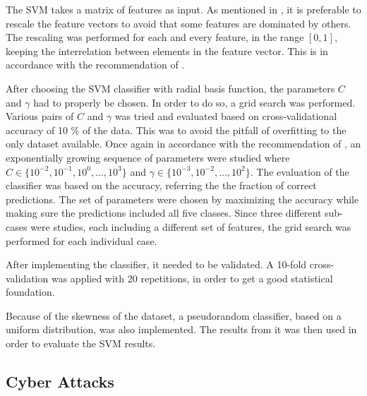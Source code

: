 The SVM takes a matrix of features as input. As mentioned in , it is preferable to rescale the feature vectors to avoid that some features are dominated by others. The rescaling was performed for each and every feature, in the range $[0,1]$, keeping the interrelation between elements in the feature vector. This is in accordance with the recommendation of \citet{Hsu10apractical}.

After choosing the SVM classifier with radial basis function, the parameters $C$ and $\gamma$ had to properly be chosen. In order to do so, a grid search was performed. Various pairs of $C$ and $\gamma$ was tried and evaluated based on cross-validational accuracy of 10 \% of the data. This was to avoid the pitfall of overfitting to the only dataset available. Once again in accordance with the recommendation of \citet{Hsu10apractical}, an exponentially growing sequence of parameters were studied where $C\in\{10^{-2},10^{-1},10^{0},...,10^{3}\}$ and $\gamma\in\{10^{-3},10^{-2},...,10^{2}\}$. The evaluation of the classifier was based on the accuracy, referring the the fraction of correct predictions. The set of parameters were chosen by maximizing the accuracy while making sure the predictions included all five classes. Since three different sub-cases were studies, each including a different set of features, the grid search was performed for each individual case. 

After implementing the classifier, it needed to be validated. A 10-fold cross-validation was applied with 20 repetitions, in order to get a good statistical foundation.

Because of the skewness of the dataset, a pseudorandom classifier, based on a uniform distribution, was also implemented.  The results from it was then used in order to evaluate the SVM results. 

\subsection{Cyber Attacks}\label{cybertattacks}



\newpage 
